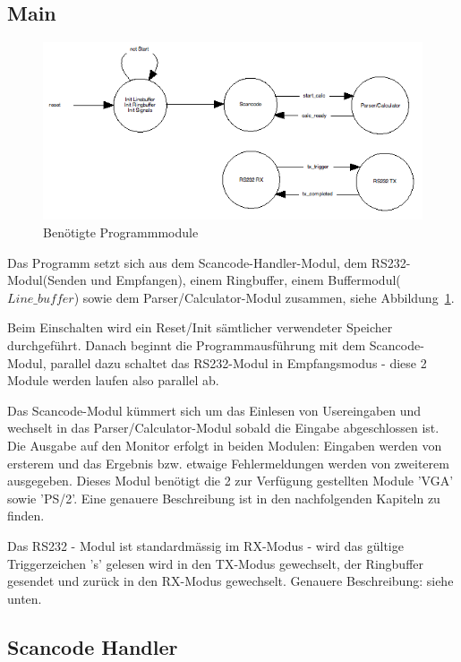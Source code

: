 \subsection{Main}

\begin{figure}[!ht]
	\centering
	\includegraphics[scale=0.5]{figures/mainSM.png} 
	\caption{Benötigte Programmmodule}
	\label{fig:mainSM}
\end{figure}

Das Programm setzt sich aus dem Scancode-Handler-Modul, dem RS232-Modul(Senden und Empfangen), einem Ringbuffer, einem Buffermodul($Line\_buffer$) sowie dem Parser/Calculator-Modul zusammen, siehe Abbildung~\ref{fig:mainSM}. 

Beim Einschalten wird ein Reset/Init sämtlicher verwendeter Speicher durchgeführt. Danach beginnt die Programmausführung mit dem Scancode-Modul, parallel dazu schaltet das RS232-Modul in Empfangsmodus - diese 2 Module werden laufen also parallel ab.

Das Scancode-Modul kümmert sich um das Einlesen von Usereingaben und wechselt in das Parser/Calculator-Modul sobald die Eingabe abgeschlossen ist. Die Ausgabe auf den Monitor erfolgt in beiden Modulen: Eingaben werden von ersterem und das Ergebnis bzw. etwaige Fehlermeldungen werden von zweiterem ausgegeben. Dieses Modul benötigt die 2 zur Verfügung gestellten Module 'VGA' sowie 'PS/2'. Eine genauere Beschreibung ist in den nachfolgenden Kapiteln zu finden.

Das RS232 - Modul ist standardmässig im RX-Modus - wird das gültige Triggerzeichen 's' gelesen wird in den TX-Modus gewechselt, der Ringbuffer gesendet und zurück in den RX-Modus gewechselt. Genauere Beschreibung: siehe unten.

\subsection{Scancode Handler}

